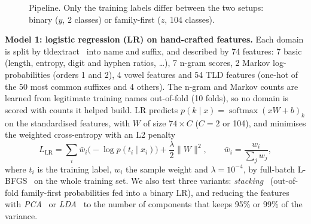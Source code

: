 \documentclass[11pt]{article}
\begin{document}
\begin{figure}[h]
\centering
{}
\caption{Pipeline. Only the training labels differ between the two setups: binary
($y$, 2 classes) or family-first ($z$, 104 classes).}
\label{fig:pipeline}
\end{figure}

\textbf{Model 1: logistic regression (LR) on hand-crafted features.} Each domain
is split by tldextract~\cite{kurkowski_tldextract} into name and suffix, and
described by 74 features: 7 basic (length, entropy, digit and hyphen ratios,
\dots), 7 n-gram scores, 2 Markov log-probabilities (orders 1 and 2), 4 vowel
features and 54 TLD features (one-hot of the 50 most common suffixes and 4
others). The n-gram and Markov counts are learned from legitimate training names
out-of-fold (10 folds), so no domain is scored with counts it helped build. LR
predicts $p(k \mid x) = \operatorname{softmax}(xW + b)_k$ on the standardised
features, with $W$ of size $74 \times C$ ($C = 2$ or 104), and minimises the
weighted cross-entropy with an L2 penalty
\begin{equation}
L_{\text{LR}} = \sum_{i} \bar{w}_i \big(-\log p(t_i \mid x_i)\big) + \frac{\lambda}{2}\lVert W \rVert^2,
\qquad \bar{w}_i = \frac{w_i}{\sum_j w_j},
\end{equation}
where $t_i$ is the training label, $w_i$ the sample weight and $\lambda = 10^{-4}$,
by full-batch L-BFGS~\cite{liu1989lbfgs,virtanen2020scipy} on the whole training set. We also test three variants: \emph{stacking}~\cite{wolpert1992stacked}
(out-of-fold family-first probabilities fed into a binary LR), and reducing the
features with \emph{PCA}~\cite{jolliffe2002pca} or \emph{LDA}~\cite{fisher1936lda}
to the number of components that keeps 95\% or 99\% of the variance.
\end{document}
